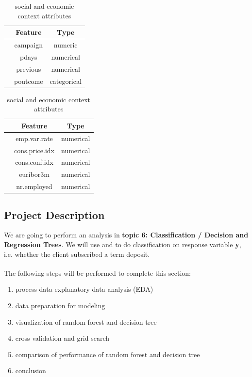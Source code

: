 \documentclass[11pt,a4paper]{article}
\newcounter{magicrownumbers}
\newcommand\rownumber{\stepcounter{magicrownumbers}\arabic{magicrownumbers}}
\begin{document}
    \begin{table}[h]
        \begin{minipage}{.5\linewidth}
            \centering
            \begin{tabular}{r c c}
                 & Feature & Type \\
                \hline \hline
                \rownumber & campaign & numeric \\
                \rownumber & pdays & numerical \\
                \rownumber & previous & numerical \\
                \rownumber & poutcome & categorical \\
            \end{tabular}
            \caption{Other attributes}\label{tab:other}
        \end{minipage}%
        \begin{minipage}{.5\linewidth}
            \centering
            \begin{tabular}{r c c}
                 & Feature & Type \\
                \hline \hline
                \rownumber & emp.var.rate & numerical \\
                \rownumber & cons.price.idx & numerical \\
                \rownumber & cons.conf.idx & numerical \\
                \rownumber & euribor3m & numerical \\
                \rownumber & nr.employed & numerical \\
            \end{tabular}
            \caption{social and economic context attributes}\label{tab:soc.econ}
        \end{minipage}
    \end{table}
    
    \subsection{Project Description}
    We are going to perform an analysis in \textbf{topic 6: Classification / Decision and Regression Trees}. We will use  and  to do classification on response variable \textbf{y}, i.e. whether the client subscribed a term deposit. \\
    \\
    The following steps will be performed to complete this section:
    \begin{enumerate}
        \item process data explanatory data analysis (EDA)
        \item data preparation for modeling
        \item visualization of random forest and decision tree
        \item cross validation and grid search
        \item comparison of performance of random forest and decision tree
        \item conclusion
    \end{enumerate}
    
\end{document}
